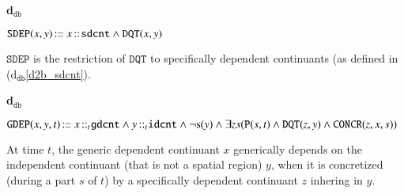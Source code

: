 \documentclass[ao]{iosart2x}
\newcommand{\bfoAxLabel}{\textrm{a$_\texttt{b}$}}
\newcommand{\dolceDefLabel}{\textrm{d$_\texttt{d}$}}
\newcommand{\dbDefLabel}{\textrm{d$_\texttt{db}$}}
\newcounter{cntdbdf}
\newcommand{\dbdf}[1]{\refstepcounter{cntdbdf}\begin{small}{\bf \dbDefLabel\thecntdbdf\label{#1}}\end{small}}
\newcommand{\refdolcedf}[1]{({\dolceDefLabel}\ref{#1})}
\newcommand{\refbfoax}[1]{({\bfoAxLabel}\ref{#1})}
\newcommand{\refdbdf}[1]{({\dbDefLabel}\ref{#1})}
\newcommand{\pr}[1]{\mathtt{#1}}
\newcommand{\cn}[1]{\mathtt{#1}}
\newcommand\textequal{%
 \rule[.08ex]{5pt}{0.35pt}\llap{\rule[.78ex]{5pt}{0.35pt}}}
\newcommand{\sdef}{{\hspace{1.5pt}:\hspace{-2.5pt}\textequal\hspace{3pt}}}
\newcommand{\bfo}{{\textsc{bfo}}}
\newcommand {\Sdcat} {\textsc{s}}
\newcommand {\Pd} {\ensuremath{\pr{P}}}
\newcommand {\DQTd} {\ensuremath{\pr{DQT}}}
\newcommand {\SDd} {\ensuremath{\pr{SD}}}
\newcommand {\EXDd} {\ensuremath{\pr{EXD}}}
\newcommand{\idcntbcat}{\cn{idcnt}}
\newcommand{\gdcntbcat}{\cn{gdcnt}}
\newcommand{\sdcntbcat}{\cn{sdcnt}}
\newcommand{\procbcat}{\cn{proc}}
\newcommand{\bfocoverlap}{\pr{cO}}
\newcommand{\bfoiof}[1]{{\,::_{#1\:\!}}}
\newcommand{\bfosdep}{\pr{SDEP}}
\newcommand{\bfogdep}{\pr{GDEP}}
\newcommand{\bfoconcr}{\pr{CONCR}}
\begin{document}
\item[\dbdf{d2b_sdep}] $\bfosdep(x,y) \sdef x \bfoiof{} \sdcntbcat \land \DQTd(x,y)$

\vspace{1pt}
$\bfosdep$ is the restriction of $\DQTd$ to specifically dependent continuants (as defined in \refdbdf{d2b_sdcnt}.

%
%
%
%

\item[\dbdf{d2b_gdep}] $\bfogdep(x,y,t) \sdef x \bfoiof{t} \gdcntbcat \land y \bfoiof{t} \idcntbcat \land \neg\Sdcat(y) \land \exists zs(\Pd(s,t) \land \DQTd(z,y) \land \bfoconcr(z,x,s))$

\vspace{1pt}
At time $t$, the generic dependent continuant $x$ generically depends on the independent continuant (that is not a spatial region) $y$, when it is concretized (during a part $s$ of $t$) by a specifically dependent continuant $z$ inhering in $y$. 

%
\end{document}
